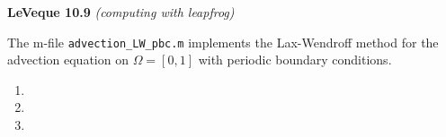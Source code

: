 \textbf{LeVeque 10.9}  \textit{(computing with leapfrog)}

The m-file \texttt{advection\_LW\_pbc.m} implements the Lax-Wendroff method for the advection equation on 
$\Omega = [0, 1]$ with periodic boundary conditions.

\begin{enumerate}
  \item 
  \pagebreak
  \item 
  \pagebreak
  \item 
\end{enumerate} 